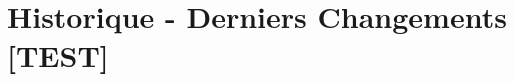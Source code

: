 \documentclass[12pt,a4paper]{article}
\newcommand\inputlast{
	
}
\begin{document}
\newpage

\section{Historique - Derniers Changements [TEST]}

\inputlast{}
\end{document}
